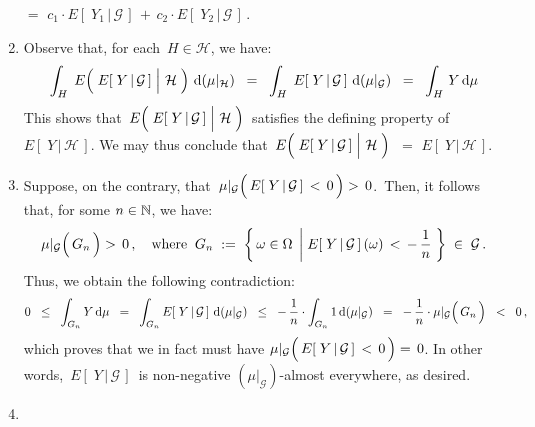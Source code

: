\begin{enumerate}
	\;$=$\;
	$c_{1}\cdot E\!\left[\;Y_{1}\,\vert\,\mathcal{G}\,\right] \,+\, c_{2}\cdot E\!\left[\;Y_{2}\,\vert\,\mathcal{G}\,\right]$\,.
\item
	Observe that, for each \,$H \in \mathcal{H}$, we have:
	\begin{eqnarray*}
	\int_{H}\;E\!\left(\,
		\left.\overset{{\color{white}.}}{E}\!\left[\;Y\,\vert\,\mathcal{G}\,\right]\;\right\vert\,\mathcal{H}
		\;\right)
		\,\d(\mu\vert_{\mathcal{H}})
	\;\; = \;\;	
		\int_{H}\;E\!\left[\;Y\,\vert\,\mathcal{G}\,\right]\,\d(\mu\vert_{\mathcal{G}})
	\;\; = \;\;	
		\int_{H}\,Y\,\d\mu
	\end{eqnarray*}
	This shows that
	\,$E\!\left(\,\left.\overset{{\color{white}.}}{E}\!\left[\;Y\,\vert\,\mathcal{G}\,\right]\;\right\vert\,\mathcal{H}\;\right)$\,
	satisfies the defining property of $E\!\left[\;Y\,\vert\,\mathcal{H}\,\right]$.
	We may thus conclude that
	\,$E\!\left(\,\left.\overset{{\color{white}.}}{E}\!\left[\;Y\,\vert\,\mathcal{G}\,\right]\;\right\vert\,\mathcal{H}\;\right)$\,
	$=$ $E\!\left[\;Y\,\vert\,\mathcal{H}\,\right]$.
\item
	Suppose, on the contrary, that
	\,$\mu\vert_{\mathcal{G}}\!\left(\,\overset{{\color{white}.}}{E}\!\left[\;Y\,\vert\,\mathcal{G}\,\right]\,<\,0\,\right) >\,0$.\,
	Then, it follows that, for some $n \in \mathbb{N}$, we have:
	\begin{equation*}
	\mu\vert_{\mathcal{G}}\!\left(\,\overset{{\color{white}.}}{G}_{n}\,\right) >\,0\,,
	\quad\textnormal{where}\;\;
	G_{n} \; :=\; \left\{\,
		\omega\in\Omega
		\;\left\vert\;
		\overset{{\color{white}.}}{E}\!\left[\;Y\,\vert\,\mathcal{G}\,\right](\omega)\,<\,-\,\dfrac{1}{n}
		\right.\,\right\}
		\;\in\;\mathcal{G}\,.
	\end{equation*}
	Thus, we obtain the following contradiction:
	\begin{equation*}
	0 \;\;\leq\;\; \int_{G_{n}} Y\,\d\mu
	\;\;=\;\; \int_{G_{n}} E\!\left[\;Y\,\vert\,\mathcal{G}\,\right]\,\d(\mu\vert_{\mathcal{G}})
	\;\;\leq\;\; -\,\dfrac{1}{n} \cdot \int_{G_{n}} 1\,\d(\mu\vert_{\mathcal{G}})
	\;\;=\;\; -\,\dfrac{1}{n} \cdot \mu\vert_{\mathcal{G}}\!\left(\,\overset{{\color{white}.}}{G}_{n}\,\right)
	\;\; < \;\; 0\,,
	\end{equation*}
	which proves that we in fact must have
	$\mu\vert_{\mathcal{G}}\!\left(\,\overset{{\color{white}.}}{E}\!\left[\;Y\,\vert\,\mathcal{G}\,\right]\,<\,0\,\right) =\,0$.
	In other words, \,$E\!\left[\;Y\,\vert\,\mathcal{G}\,\right]$\, is non-negative
	$(\mu\vert_{\mathcal{G}})$-almost everywhere, as desired.
\item

\end{enumerate}
